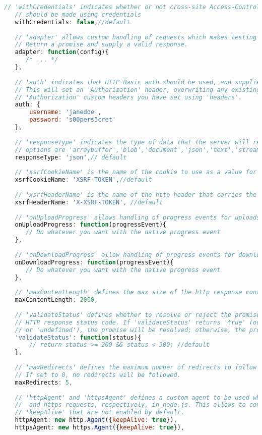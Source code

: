 \begin{lstlisting}[language=JavaScript]
   // 'withCredentials' indicates whether or not cross-site Access-Control requests
   // should be made using credentials
   withCredentials: false,//default
   
   // 'adapter' allows custom handling of requests which makes testing easier.
   // Return a promise and supply a valid response.
   adapter: function(config){
      /* ... */
   },
   
   // 'auth' indicates that HTTP Basic auth should be used, and supplies credentials.
   // This will set an 'Authorization' header, overwriting any existing
   // 'Authorization' custom headers you have set using 'headers'.
   auth: {
       username: 'janedoe',
       password: 's00pers3cret'
   },
   
   // 'responseType' indicates the type of data that the server will respond with 
   // options are 'arraybuffer','blob','document','json','text','stream'.
   responseType: 'json',// default
   
   // 'xsrfCookieName' is the name of the cookie to use as a value for xsrf token
   xsrfCookieName: 'XSRF-TOKEN',//default
   
   // 'xsrfHeaderName' is the name of the http header that carries the xsrf token value
   xsrfHeaderName: 'X-XSRF-TOKEN', //default
   
   // 'onUploadProgress' allows handling of progress events for uploads
   onUploadProgress: function(progressEvent){
      // Do whatever you want with the native progress event
   },
   
   // 'onDownloadProgress' allow handling of progress events for downloads
   onDownloadProgress: function(progressEvent){
      // Do whatever you want with the native progress event
   },
   
   // 'maxContentLength' defines the max size of the http response content allowed
   maxContentLength: 2000,
   
   // 'validateStatus' defines whether to resolve or reject the promise for a given 
   // HTTP response status code. If 'validateStatus' returns 'true' (or is set to 'null' 
   // or 'undefined'), the promise will be resolved; otherwise, the promise will be rejected.
   'validateStatus': function(status){
       // return status >= 200 && status < 300; //default
   },
   
   // 'maxRedirects' defines the maximum number of redirects to follow in node.js.
   // If set to 0, no redirects will be followed.
   maxRedirects: 5,
   
   // 'httpAgent' and 'httpsAgent' defines a custom agent to be used when performing http 
   //  and https requests, respectively, in node.js. This allows to configure options like
   // 'keepAlive' that are not enabled by default.
   httpAgent: new http.Agent({keepAlive: true}),
   httpsAgent: new https.Agent({keepAlive: true}),
   

\end{lstlisting}
